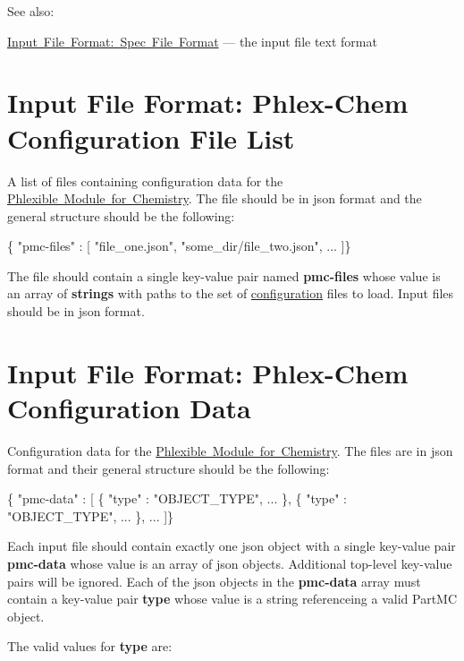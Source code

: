 See also\+:
\begin{DoxyItemize}
\item \mbox{\hyperlink{spec_file_format}{Input File Format\+: Spec File Format}} --- the input file text format 
\end{DoxyItemize}\hypertarget{input_format_phlex_file_list}{}\section{Input File Format\+: Phlex-\/\+Chem Configuration File List}\label{input_format_phlex_file_list}
A list of files containing configuration data for the \mbox{\hyperlink{phlex_chem}{Phlexible Module for Chemistry}}. The file should be in {\ttfamily json} format and the general structure should be the following\+:


\begin{DoxyCode}
\{ "pmc-files" : [
  "file\_one.json",
  "some\_dir/file\_two.json",
  ...
]\}
\end{DoxyCode}
 The file should contain a single key-\/value pair named {\bfseries pmc-\/files} whose value is an array of {\bfseries strings} with paths to the set of \mbox{\hyperlink{input_format_phlex_config}{configuration}} files to load. Input files should be in {\ttfamily json} format. \hypertarget{input_format_phlex_config}{}\section{Input File Format\+: Phlex-\/\+Chem Configuration Data}\label{input_format_phlex_config}
Configuration data for the \mbox{\hyperlink{phlex_chem}{Phlexible Module for Chemistry}}. The files are in {\ttfamily json} format and their general structure should be the following\+:


\begin{DoxyCode}
\{ "pmc-data" : [
  \{
    "type" : "OBJECT\_TYPE",
    ...
  \},
  \{
    "type" : "OBJECT\_TYPE",
    ...
  \},
  ...
]\}
\end{DoxyCode}
 Each input file should contain exactly one {\ttfamily json} object with a single key-\/value pair {\bfseries pmc-\/data} whose value is an array of {\ttfamily json} objects. Additional top-\/level key-\/value pairs will be ignored. Each of the {\ttfamily json} objects in the {\bfseries pmc-\/data} array must contain a key-\/value pair {\bfseries type} whose value is a string referenceing a valid Part\+MC object.

The valid values for {\bfseries type} are\+:


